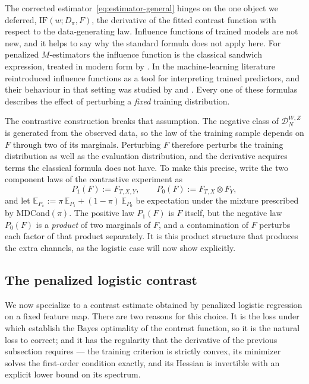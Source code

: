 \documentclass[11pt]{article}
\theoremstyle{plain}
\theoremstyle{definition}
\theoremstyle{remark}
\newcommand{\MDC}{\ensuremath{\text{MDCond}}}
\newcommand{\pE}{\ensuremath{\mathbb{E}}}
\newcommand{\ratio}{\ensuremath{\pi}}
\newcommand{\contrast}{D_{\ratio}}
\newcommand{\mDwz}[1]{\ensuremath{\mathcal{D}}_{#1}^{W,Z}}
\newcommand{\IF}{\mathrm{IF}}
\begin{document}
The corrected estimator~\eqref{eq:estimator-general} hinges on the one object we deferred,
$\IF(w;\contrast,F)$, the derivative of the fitted contrast function with respect to the
data-generating law. Influence functions of trained models are not new, and it helps to say why
the standard formula does not apply here. For penalized $M$-estimators the influence function is the classical sandwich
expression, treated in modern form by \citet{avella2017}. In the machine-learning literature
\citet{kohliang2017} reintroduced influence functions as a tool for interpreting trained
predictors, and their behaviour in that setting was studied by \citet{basu2021} and
\citet{bae2022}. Every one of these formulas describes the effect of perturbing a
\emph{fixed} training distribution.

The contrastive construction breaks that assumption. The negative class of $\mDwz{N}$ is
generated from the observed data, so the law of the training sample depends on $F$ through two
of its marginals. Perturbing $F$ therefore perturbs the training distribution as well as the
evaluation distribution, and the derivative acquires terms the classical formula does not have.
To make this precise, write the two component laws of the contrastive experiment as
\begin{equation}
P_1(F) := F_{T,X,Y}, \qquad
P_0(F) := F_{T,X} \otimes F_Y ,
\label{eq:laws}
\end{equation}
and let $\pE_{P_\ratio} := \ratio\,\pE_{P_1} + (1-\ratio)\,\pE_{P_0}$ be expectation under the
mixture prescribed by $\MDC(\ratio)$. The positive law $P_1(F)$ is $F$ itself, but the negative
law $P_0(F)$ is a \emph{product} of two marginals of $F$, and a contamination of $F$ perturbs
each factor of that product separately. It is this product structure that produces the extra
channels, as the logistic case will now show explicitly.

\subsection{The penalized logistic contrast}
\label{sec:mcd-logistic}

We now specialize to a contrast estimate obtained by penalized logistic regression on a fixed
feature map. There are two reasons for this choice. It is the loss under which
\citet{meziani2025mcd} establish the Bayes optimality of the contrast function, so it is the
natural loss to correct; and it has the regularity that the derivative of the previous
subsection requires --- the training criterion is strictly convex, its minimizer solves the
first-order condition exactly, and its Hessian is invertible with an explicit lower bound on
its spectrum.
\end{document}
